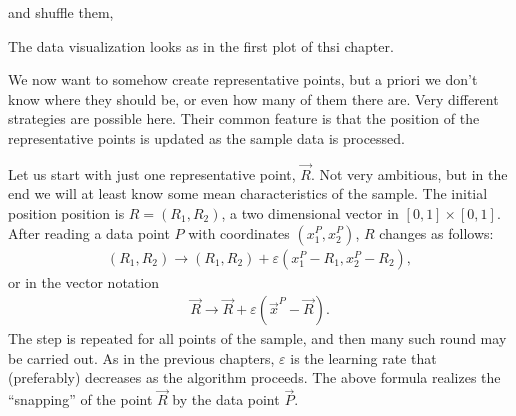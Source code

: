 \documentclass[letterpaper,10pt,english]{jupyterBook}
\begin{document}
\begin{sphinxVerbatim}[commandchars=\\\{\}]
   
\end{sphinxVerbatim}

\sphinxAtStartPar
and shuffle them,

\begin{sphinxVerbatim}[commandchars=\\\{\}]
\end{sphinxVerbatim}

\sphinxAtStartPar
The data visualization looks as in the first plot of thsi chapter.

\sphinxAtStartPar
We now want to somehow create representative points, but a priori we don’t know where they should be, or even how many of them there are. Very different strategies are possible here. Their common feature is that the position of the representative points is updated as the sample data is processed.

\sphinxAtStartPar
Let us start with just one representative point, \(\vec{R}\). Not very ambitious, but in the end we will at least know some mean characteristics of the sample. The initial position  position is \( R=(R_1, R_2) \), a two dimensional vector in \([0,1]\times [0,1]\). After reading a data point \(P\) with coordinates \( (x_1 ^ P, x_2 ^ P) \), \(R\) changes as follows:
\begin{equation*}
\begin{split} (R_1, R_2) \to (R_1, R_2) + \varepsilon (x_1 ^P-R_1, x_2 ^P-R_2), \end{split}
\end{equation*}
\sphinxAtStartPar
or in the vector notation
\begin{equation*}
\begin{split} \vec {R} \to \vec {R} + \varepsilon (\vec {x}^P - \vec {R}). \end{split}
\end{equation*}
\sphinxAtStartPar
The step is repeated for all points of the sample, and then many such round may be carried out. As in the previous chapters, \( \varepsilon \) is the learning rate that (preferably) decreases
as the algorithm proceeds. The above formula realizes the “snapping” of the point \(\vec{R}\) by the data point \(\vec{P}\).
\end{document}
